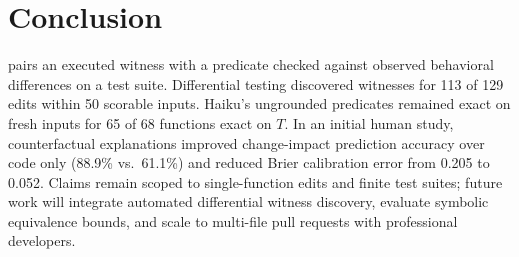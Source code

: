 \section{Conclusion}\label{sec:conclusion}
\CoDE pairs an executed witness with a predicate checked against observed behavioral differences on a test suite. Differential testing discovered witnesses for 113 of 129 edits within 50 scorable inputs. Haiku's ungrounded predicates remained exact on fresh inputs for 65 of 68 functions exact on $T$. In an initial human study, counterfactual explanations improved change-impact prediction accuracy over code only (88.9\% vs.\ 61.1\%) and reduced Brier calibration error from 0.205 to 0.052. Claims remain scoped to single-function edits and finite test suites; future work will integrate automated differential witness discovery, evaluate symbolic equivalence bounds, and scale to multi-file pull requests with professional developers.
